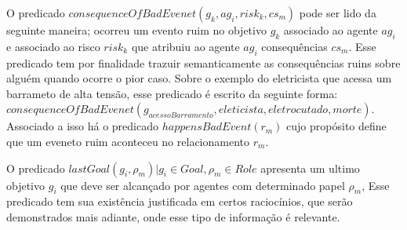 O predicado $consequenceOfBadEvenet(g_k, ag_i,risk_k,cs_m)$ pode ser lido da seguinte maneira; ocorreu um evento ruim no 
objetivo $g_k$ associado ao agente $ag_i$ e associado ao risco $risk_k$ que atribuiu ao agente $ag_i$ consequências $cs_m$. Esse 
predicado tem por finalidade trazuir semanticamente as consequências ruins sobre alguém quando ocorre o pior caso. Sobre o exemplo 
do eletricista que acessa um barrameto de alta tensão, esse predicado é escrito da seguinte forma:
$consequenceOfBadEvenet(g_{acessoBarramento}, eleticista,eletrocutado,morte)$. Associado a isso há o predicado $happensBadEvent(r_m)$
cujo propósito define que um eveneto ruim aconteceu no relacionamento $r_m$.

O predicado $lastGoal(g_i,\rho_m) | g_i \in Goal, \rho_m \in Role $ apresenta um ultimo objetivo $g_i$ que deve ser alcançado 
por agentes com determinado papel $\rho_m$, Esse predicado tem sua existência justificada em certos raciocínios, que serão demonstrados 
mais adiante, onde esse tipo de informação é relevante.